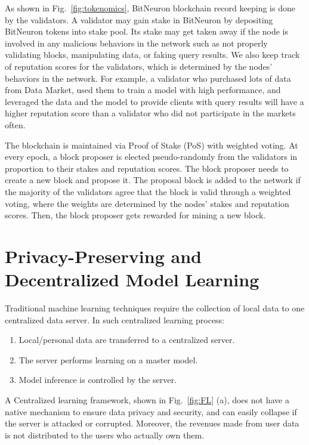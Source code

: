 \documentclass[11pt,letterpaper]{article}
\begin{document}
As shown in  Fig.~\ref{fig:tokenomics}, BitNeuron blockchain record keeping is done by the validators. A validator may gain stake in BitNeuron by depositing BitNeuron tokens into stake pool. Its stake may get taken away if the node is involved in any malicious behaviors in the network such as not properly validating blocks, manipulating data, or faking query results. We also keep track of reputation scores for the validators, which is determined by the nodes' behaviors in the network. For example, a validator who purchased lots of data from Data Market, used them to train a model with high performance, and leveraged the data and the model to provide clients with query results will have a higher reputation score than a validator who did not participate in the markets often.

The blockchain is maintained via Proof of Stake (PoS) with weighted voting. At every epoch, a block proposer is elected pseudo-randomly from the validators in proportion to their stakes and reputation scores. The block proposer needs to create a new block and propose it. The proposal block is added to the network if the majority of the validators agree that the block is valid through a weighted voting, where the weights are determined by the nodes' stakes and reputation scores. Then, the block proposer gets rewarded for mining a new block.

\section{Privacy-Preserving and Decentralized Model Learning}


Traditional machine learning techniques require the collection of local data to one centralized data server. In such centralized learning process:
\begin{enumerate}
  \item Local/personal data are transferred to a centralized server.
  \item The server performs learning on a master model.
  \item Model inference is controlled by the server.
\end{enumerate}
A Centralized learning framework, shown in Fig.~\ref{fig:FL} (a), does not have a native mechanism to ensure data privacy and security, and can easily collapse if the server is attacked or corrupted. Moreover, the revenues made from user data is not distributed to the users who actually own them. 
\end{document}
